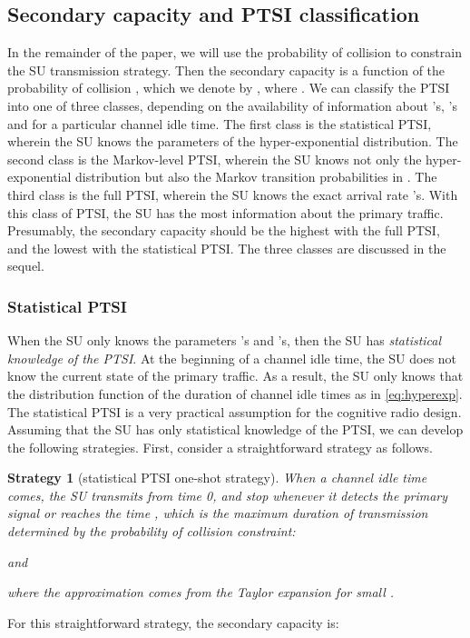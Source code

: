 \documentclass[10pt,final,journal,letterpaper]{IEEEtran}
\newtheorem{strategy}{Strategy}
\begin{document}
\subsection{Secondary capacity and PTSI classification}
In the remainder of the paper, we will use the probability of collision to constrain the SU transmission strategy. Then the secondary capacity is a function of the probability of collision , which we denote by , where . We can classify the PTSI into one of three classes, depending on the availability of information about 's, 's and  for a particular channel idle time. The first class is the statistical PTSI, wherein the SU knows the parameters of the hyper-exponential distribution. The second class is the Markov-level PTSI, wherein the SU knows not only the hyper-exponential distribution but also the Markov transition probabilities in . The third class is the full PTSI, wherein the SU knows the exact arrival rate 's. With this class of PTSI, the SU has the most information about the primary traffic. Presumably, the secondary capacity should be the highest with the full PTSI, and the lowest with the statistical PTSI. The three classes are discussed in the sequel.

\subsubsection{Statistical PTSI}
When the SU only knows the parameters 's and 's, then the SU has \emph{statistical knowledge of the PTSI}. At the beginning of a channel idle time, the SU does not know the current state of the primary traffic. As a result, the SU only knows that the distribution function of the duration of channel idle times as in \eqref{eq:hyperexp}. The statistical PTSI is a very practical assumption for the cognitive radio design. Assuming that the SU has only statistical knowledge of the PTSI, we can develop the following strategies. First, consider a straightforward strategy as follows.
\begin{strategy}[statistical PTSI one-shot strategy]\label{str1}
When a channel idle time comes, the SU transmits from time 0, and stop whenever it detects the primary signal or reaches the time , which is the maximum duration of transmission determined by the probability of collision constraint:

and

where the approximation comes from the Taylor expansion for small .
\end{strategy}
For this straightforward strategy, the secondary capacity is:
\end{document}
